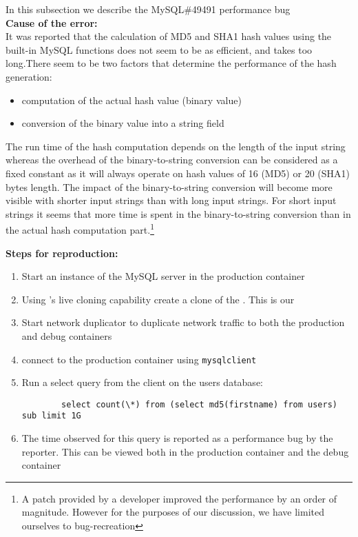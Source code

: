 In this subsection we describe the MySQL\#49491 performance bug \\

\noindent \textbf{Cause of the error:} \\

It was reported that the calculation of MD5 and SHA1 hash values using the built-in MySQL functions does not seem to be as efficient, and takes too long.There seem to be two factors that determine the performance of the hash generation:
\begin{itemize}
	\item computation of the actual hash value (binary value)
	\item conversion of the binary value into a string field
\end{itemize}

The run time of the hash computation depends on the length of the input string whereas the overhead of the binary-to-string conversion can be considered as a fixed constant as it will always operate on hash values of 16 (MD5) or 20 (SHA1) bytes length.
The impact of the binary-to-string conversion will become more visible with shorter input strings than with long input strings. For short input strings it seems that more time is spent in the binary-to-string conversion than in the actual hash computation part.\footnote{A patch provided by a developer improved the performance by an order of magnitude. However for the purposes of our discussion, we have limited ourselves to bug-recreation}

\noindent \textbf{Steps for reproduction:} \\

\begin{adjustwidth}{0.5cm}{}
	\begin{enumerate}
		\item Start an instance of the MySQL server in the production container
		\item Using \parikshan's live cloning capability create a clone of the \productioncontainer. This is our \debugcontainer
		\item Start network duplicator to duplicate network traffic to both the production and debug containers
		\item connect to the production container using \texttt{mysqlclient}
		\item Run a select query from the client on the users database:
		
		\begin{lstlisting}
		select count(\*) from (select md5(firstname) from users) sub limit 1G
		\end{lstlisting}
		
		\item The time observed for this query is reported as a performance bug by the reporter. This can be viewed both in the production container and the debug container
		
	\end{enumerate}
\end{adjustwidth}	



